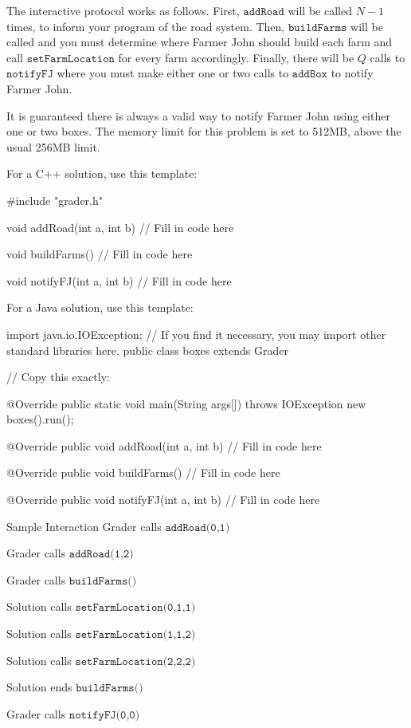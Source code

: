 \documentclass[12pt]{article}
\begin{document}
The interactive protocol works as follows. First, $\texttt{addRoad}$ will be
called $N-1$ times, to inform your program of the road system. Then,
$\texttt{buildFarms}$ will be called and you must determine where Farmer John
should build each farm and call $\texttt{setFarmLocation}$ for every farm
accordingly. Finally, there will be $Q$ calls to $\texttt{notifyFJ}$ where you
must make either one or two calls to $\texttt{addBox}$ to notify Farmer John.

It is guaranteed there is always a valid way to notify Farmer John using either
one or two boxes.  The memory limit for this problem is set to 512MB, above
the usual 256MB limit.

For a C++ solution, use this template:

#include "grader.h"

void addRoad(int a, int b){
	// Fill in code here
}

void buildFarms(){
	// Fill in code here
}

void notifyFJ(int a, int b){
	// Fill in code here
}

For a Java solution, use this template:

import java.io.IOException;
// If you find it necessary, you may import other standard libraries here.
public class boxes extends Grader {

  	// Copy this exactly:
        
@Override
  	public static void main(String args[]) throws IOException { new boxes().run(); }

        
@Override
  	public void addRoad(int a, int b) {
      // Fill in code here
  	}
        
@Override
  	public void buildFarms(){
      // Fill in code here
	  }
  	
@Override
  	public void notifyFJ(int a, int b){
      // Fill in code here
  	}
}

 Sample Interaction 
Grader calls $\texttt{addRoad(0,1)}$

Grader calls $\texttt{addRoad(1,2)}$

Grader calls $\texttt{buildFarms()}$

Solution calls $\texttt{setFarmLocation(0,1,1)}$

Solution calls $\texttt{setFarmLocation(1,1,2)}$

Solution calls $\texttt{setFarmLocation(2,2,2)}$

Solution ends $\texttt{buildFarms()}$

Grader calls $\texttt{notifyFJ(0,0)}$
\end{document}
